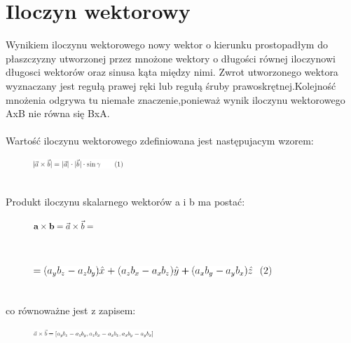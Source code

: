 \section{Iloczyn wektorowy}
Wynikiem iloczynu wektorowego nowy wektor o kierunku prostopadłym do płaszczyzny utworzonej przez mnożone wektory o długości równej iloczynowi długosci wektorów oraz sinusa kąta między nimi. Zwrot utworzonego wektora wyznaczany jest regułą prawej ręki lub regułą śruby prawoskrętnej.Kolejność mnożenia odgrywa tu niemałe znaczenie,ponieważ wynik iloczynu wektorowego AxB nie równa się BxA. \\ \\
Wartość iloczynu wektorowego zdefiniowana jest następujacym wzorem: \\
\begin{figure}[h]
\centering
\includegraphics[width=0.3\textwidth]{figures/iloczyn1.png}
\end{figure} \\
Produkt iloczynu skalarnego wektorów a i b ma postać: \\
\begin{figure}[h]
\centering
\includegraphics[width=0.2\textwidth]{figures/iloczyn2.png}
\end{figure} \\
\begin{figure}[h]
\centering
\includegraphics[width=0.8\textwidth]{figures/iloczyn21.png}
\end{figure} \\
co równoważne jest z zapisem: 
\begin{figure}[h]
\centering
\includegraphics[width=0.4\textwidth]{figures/iloczyn22.png}
\end{figure} \\
